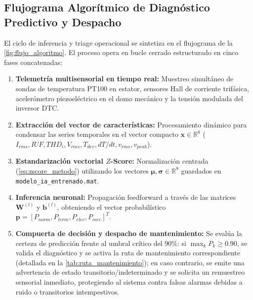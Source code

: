\documentclass[conference]{IEEEtran}
\begin{document}
\subsection{Flujograma Algorítmico de Diagnóstico Predictivo y Despacho}
El ciclo de inferencia y triage operacional se sintetiza en el flujograma de la \autoref{fig:flujo_algoritmo}. El proceso opera en bucle cerrado estructurado en cinco fases concatenadas:
\begin{enumerate}
    \item \textbf{Telemetría multisensorial en tiempo real:} Muestreo simultáneo de sondas de temperatura PT100 en estator, sensores Hall de corriente trifásica, acelerómetro piezoeléctrico en el domo mecánico y la tensión modulada del inversor DTC.
    \item \textbf{Extracción del vector de características:} Procesamiento dinámico para condensar las series temporales en el vector compacto $\mathbf{x} \in \mathbb{R}^8$ ($I_{rms}, IUF, THD_i, V_{rms}, T_{dev}, dT/dt, v_{rms}, v_{peak}$).
    \item \textbf{Estandarización vectorial $Z$-Score:} Normalización centrada (\autoref{eq:zscore_metodo}) utilizando los vectores $\boldsymbol{\mu}, \boldsymbol{\sigma} \in \mathbb{R}^8$ guardados en \texttt{modelo\_ia\_entrenado.mat}.
    \item \textbf{Inferencia neuronal:} Propagación feedforward a través de las matrices $\mathbf{W}^{(l)}$ y $\mathbf{b}^{(l)}$, obteniendo el vector probabilístico $\mathbf{p} = [P_{norm}, P_{term}, P_{elec}, P_{mec}]^T$.
    \item \textbf{Compuerta de decisión y despacho de mantenimiento:} Se evalúa la certeza de predicción frente al umbral crítico del $90\%$: si $\max_k P_k \ge 0.90$, se valida el diagnóstico y se activa la ruta de mantenimiento correspondiente (detallada en la \autoref{tab:ruta_mantenimiento}); en caso contrario, se emite una advertencia de estado transitorio/indeterminado y se solicita un remuestreo sensorial inmediato, protegiendo al sistema contra falsas alarmas debidas a ruido o transitorios intempestivos.
\end{enumerate}
\end{document}
